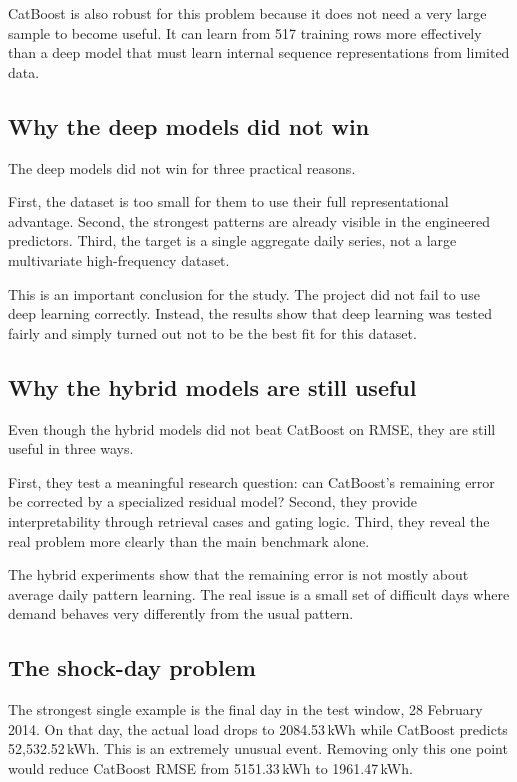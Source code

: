 \documentclass[conference]{IEEEtran}
\begin{document}
CatBoost is also robust for this problem because it does not need a very large sample to become useful. It can learn from 517 training rows more effectively than a deep model that must learn internal sequence representations from limited data.

\subsection{Why the deep models did not win}
The deep models did not win for three practical reasons.

First, the dataset is too small for them to use their full representational advantage. Second, the strongest patterns are already visible in the engineered predictors. Third, the target is a single aggregate daily series, not a large multivariate high-frequency dataset.

This is an important conclusion for the study. The project did not fail to use deep learning correctly. Instead, the results show that deep learning was tested fairly and simply turned out not to be the best fit for this dataset.

\subsection{Why the hybrid models are still useful}
Even though the hybrid models did not beat CatBoost on RMSE, they are still useful in three ways.

First, they test a meaningful research question: can CatBoost's remaining error be corrected by a specialized residual model? Second, they provide interpretability through retrieval cases and gating logic. Third, they reveal the real problem more clearly than the main benchmark alone.

The hybrid experiments show that the remaining error is not mostly about average daily pattern learning. The real issue is a small set of difficult days where demand behaves very differently from the usual pattern.

\subsection{The shock-day problem}
The strongest single example is the final day in the test window, 28 February 2014. On that day, the actual load drops to 2084.53\,kWh while CatBoost predicts 52,532.52\,kWh. This is an extremely unusual event. Removing only this one point would reduce CatBoost RMSE from 5151.33\,kWh to 1961.47\,kWh.
\end{document}
